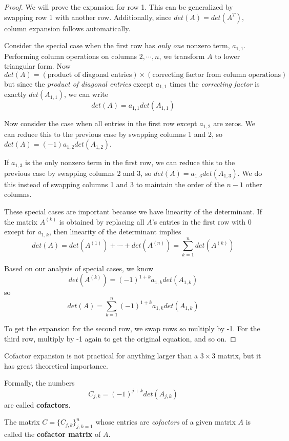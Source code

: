 \begin{proof}
We will prove the expansion for row 1. This can be generalized by swapping row 1 with another row. Additionally, since $det(A) = det(A^{T})$, column expansion follows automatically. 

Consider the special case when the first row has \textit{only one} nonzero term, $a_{1, 1}$. Performing column operations on columns $2, \cdots, n$, we transform $A$ to lower triangular form. Now
$$det(A) = (\text{product of diagonal entries}) \times (\text{correcting factor from column operations})$$
but since the \textit{product of diagonal entries} except $a_{1,1}$ times the \textit{correcting factor} is exactly $det(A_{1,1})$, we can write 
$$det(A) = a_{1,1} det(A_{1,1})$$

Now consider the case when all entries in the first row except $a_{1,2}$ are zeros. We can reduce this to the previous case by swapping columns 1 and 2, so $det(A) = (-1) a_{1,2} det(A_{1,2})$. 

If $a_{1,3}$ is the only nonzero term in the first row, we can reduce this to the previous case by swapping columns 2 and 3, so $det(A) = a_{1,3} det(A_{1,3})$. We do this instead of swapping columns 1 and 3 to maintain the order of the $n-1$ other columns. 

These special cases are important because we have linearity of the determinant. If the matrix $A^{(k)}$ is obtained by replacing all $A$'s entries in the first row with 0 except for $a_{1,k}$, then linearity of the determinant implies 
$$det(A) = det(A^{(1)}) + \cdots + det(A^{(n)}) = \sum_{k=1}^{n} det(A^{(k)})$$

Based on our analysis of special cases, we know 
$$det(A^{(k)}) = (-1)^{1 + k} a_{1, k} det(A_{1, k})$$ 
so 
$$det(A) = \sum_{k=1}^{n} (-1)^{1 + k} a_{1, k} det(A_{1,k})$$

To get the expansion for the second row, we swap rows so multiply by -1. For the third row, multiply by -1 again to get the original equation, and so on. 
\end{proof}

Cofactor expansion is not practical for anything larger than a $3 \times 3$ matrix, but it has great theoretical importance. 

\begin{definition}
Formally, the numbers 
$$C_{j, k}= (-1)^{j + k} det(A_{j,k})$$
are called \textbf{cofactors}.

The matrix $C = \{ C_{j, k}\}^{n}_{j, k = 1}$ whose entries are \textit{cofactors} of a given matrix $A$ is called the \textbf{cofactor matrix} of $A$. 
\end{definition}


